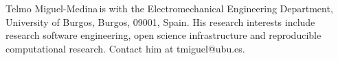 \documentclass{IEEEcsmag}
\begin{document}
\begin{IEEEbiography}{Telmo Miguel-Medina}{\,}is with the Electromechanical Engineering Department, University of Burgos, Burgos, 09001, Spain. His research interests include research software engineering, open science infrastructure and reproducible computational research. Contact him at tmiguel@ubu.es.
\end{IEEEbiography}
\end{document}

